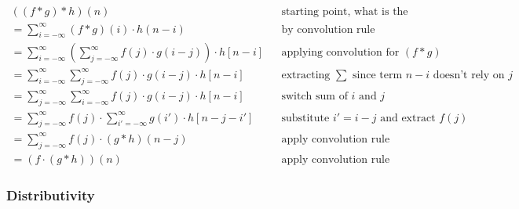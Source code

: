 \documentclass[11pt]{article}
\begin{document}
\begin{definition}
    \begin{align*}
        ((f\ast g) \ast h)(n)                                                            &  & \text{starting point, what is the convoution at position n?}               \\
        = \sum^\infty_{i=-\infty}(f \ast g)(i) \cdot h(n-i)                              &  & \text{by convolution rule}                                                 \\
        = \sum^\infty_{i=-\infty}(\sum^\infty_{j=-\infty}f(j) \cdot g(i-j)) \cdot h[n-i] &  & \text{applying convolution for } (f \ast g)                                \\
        = \sum^\infty_{i=-\infty}\sum^\infty_{j=-\infty}f(j) \cdot g(i-j) \cdot h[n-i]   &  & \text{extracting } \sum \text{ since term } n-i \text{ doesn't rely on } j \\
        = \sum^\infty_{j=-\infty}\sum^\infty_{i=-\infty}f(j) \cdot g(i-j) \cdot h[n-i]   &  & \text{switch sum of } i \text{ and } j                                     \\
        = \sum^\infty_{j=-\infty}f(j) \cdot\sum^\infty_{i'=-\infty}g(i') \cdot h[n-j-i'] &  & \text{substitute } i'=i-j \text{ and extract } f(j)                        \\
        = \sum^\infty_{j=-\infty}f(j) \cdot (g \ast h)(n-j)                              &  & \text{apply convolution rule}                                              \\
        = (f \cdot (g \ast h))(n)                                                        &  & \text{apply convolution rule}
    \end{align*}
\end{definition}

\subsubsection{Distributivity}
\end{document}
